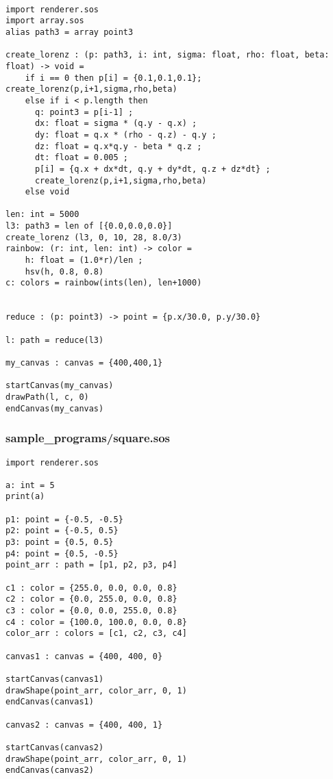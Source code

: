\documentclass[main.tex]{subfiles}
\begin{document}
\begin{lstlisting}

import renderer.sos
import array.sos
alias path3 = array point3

create_lorenz : (p: path3, i: int, sigma: float, rho: float, beta: float) -> void = 
    if i == 0 then p[i] = {0.1,0.1,0.1}; create_lorenz(p,i+1,sigma,rho,beta)
    else if i < p.length then
      q: point3 = p[i-1] ;
      dx: float = sigma * (q.y - q.x) ;
      dy: float = q.x * (rho - q.z) - q.y ;
      dz: float = q.x*q.y - beta * q.z ;
      dt: float = 0.005 ;
      p[i] = {q.x + dx*dt, q.y + dy*dt, q.z + dz*dt} ;
      create_lorenz(p,i+1,sigma,rho,beta)
    else void

len: int = 5000
l3: path3 = len of [{0.0,0.0,0.0}]
create_lorenz (l3, 0, 10, 28, 8.0/3)
rainbow: (r: int, len: int) -> color = 
    h: float = (1.0*r)/len ;
    hsv(h, 0.8, 0.8)
c: colors = rainbow(ints(len), len+1000)


reduce : (p: point3) -> point = {p.x/30.0, p.y/30.0}

l: path = reduce(l3)

my_canvas : canvas = {400,400,1}

startCanvas(my_canvas)
drawPath(l, c, 0)
endCanvas(my_canvas)

\end{lstlisting}

\subsubsection{sample\_programs/square.sos}
\begin{lstlisting}
import renderer.sos

a: int = 5 
print(a)

p1: point = {-0.5, -0.5}
p2: point = {-0.5, 0.5}
p3: point = {0.5, 0.5}
p4: point = {0.5, -0.5}
point_arr : path = [p1, p2, p3, p4] 

c1 : color = {255.0, 0.0, 0.0, 0.8}
c2 : color = {0.0, 255.0, 0.0, 0.8}
c3 : color = {0.0, 0.0, 255.0, 0.8}
c4 : color = {100.0, 100.0, 0.0, 0.8}
color_arr : colors = [c1, c2, c3, c4] 

canvas1 : canvas = {400, 400, 0}

startCanvas(canvas1)
drawShape(point_arr, color_arr, 0, 1)
endCanvas(canvas1)

canvas2 : canvas = {400, 400, 1}

startCanvas(canvas2)
drawShape(point_arr, color_arr, 0, 1)
endCanvas(canvas2)
\end{lstlisting}
\end{document}
